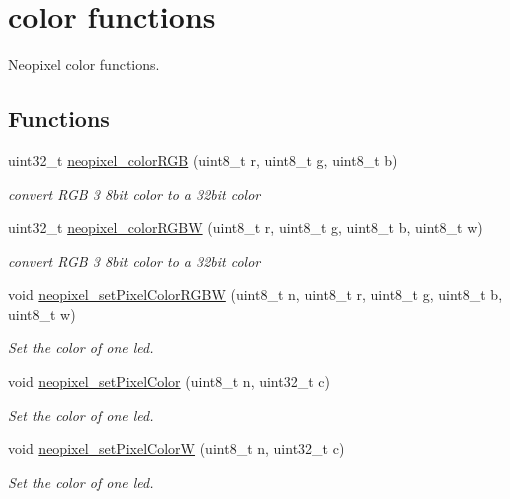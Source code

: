 \hypertarget{group___neopixel}{}\section{color functions}
\label{group___neopixel}


Neopixel color functions.  


\subsection*{Functions}
\begin{DoxyCompactItemize}
\item 
uint32\+\_\+t \hyperlink{group___neopixel_ga40253bdc59873753452f3179a8ee1762}{neopixel\+\_\+color\+R\+GB} (uint8\+\_\+t r, uint8\+\_\+t g, uint8\+\_\+t b)
\begin{DoxyCompactList}\small\item\em convert R\+GB 3 8bit color to a 32bit color \end{DoxyCompactList}\item 
uint32\+\_\+t \hyperlink{group___neopixel_ga70ca37e59d1bf154f1426c8eeb5c1cf2}{neopixel\+\_\+color\+R\+G\+BW} (uint8\+\_\+t r, uint8\+\_\+t g, uint8\+\_\+t b, uint8\+\_\+t w)
\begin{DoxyCompactList}\small\item\em convert R\+GB 3 8bit color to a 32bit color \end{DoxyCompactList}\item 
void \hyperlink{group___neopixel_ga8eb6ad73b1bd1df8bddc2615035a3371}{neopixel\+\_\+set\+Pixel\+Color\+R\+G\+BW} (uint8\+\_\+t n, uint8\+\_\+t r, uint8\+\_\+t g, uint8\+\_\+t b, uint8\+\_\+t w)
\begin{DoxyCompactList}\small\item\em Set the color of one led. \end{DoxyCompactList}\item 
void \hyperlink{group___neopixel_ga71a91c14cda530d83c6bbb241fc9bf96}{neopixel\+\_\+set\+Pixel\+Color} (uint8\+\_\+t n, uint32\+\_\+t c)
\begin{DoxyCompactList}\small\item\em Set the color of one led. \end{DoxyCompactList}\item 
void \hyperlink{group___neopixel_gaff8fc0f23014295654811a1ec909f204}{neopixel\+\_\+set\+Pixel\+ColorW} (uint8\+\_\+t n, uint32\+\_\+t c)
\begin{DoxyCompactList}\small\item\em Set the color of one led. \end{DoxyCompactList}\item 

\end{DoxyCompactItemize}
